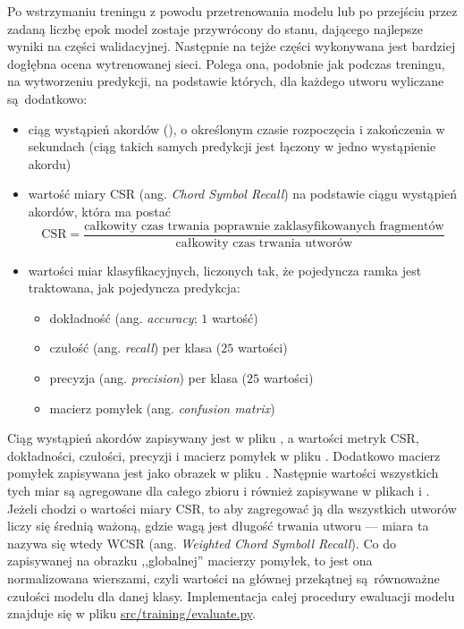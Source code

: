 Po wstrzymaniu treningu z powodu przetrenowania modelu lub po przejściu przez zadaną liczbę epok model zostaje przywrócony do stanu, dającego najlepsze wyniki na części walidacyjnej. Następnie na tejże części wykonywana jest bardziej dogłębna ocena wytrenowanej sieci. Polega ona, podobnie jak podczas treningu, na wytworzeniu predykcji, na podstawie których, dla każdego utworu wyliczane są dodatkowo: 
\begin{itemize}
    \item ciąg wystąpień akordów (), o określonym czasie rozpoczęcia i
        zakończenia w sekundach (ciąg takich samych predykcji jest łączony w jedno wystąpienie
        akordu)
    \item wartość miary CSR (ang. \emph{Chord Symbol Recall}) na podstawie
        ciągu wystąpień akordów, która ma postać
        \begin{displaymath}
            \textrm{CSR} = \frac
                        {\textrm{całkowity czas trwania poprawnie zaklasyfikowanych fragmentów}}
                        {\textrm{całkowity czas trwania utworów}}
        \end{displaymath}
    \item wartości miar klasyfikacyjnych, liczonych tak, że pojedyncza ramka jest traktowana, jak
        pojedyncza predykcja:
        \begin{itemize}
            \item dokładność (ang. \emph{accuracy}; $1$ wartość)
            \item czułość (ang. \emph{recall}) per klasa ($25$ wartości)
            \item precyzja (ang. \emph{precision}) per klasa ($25$ wartości)
            \item macierz pomyłek (ang. \emph{confusion matrix})
        \end{itemize}
\end{itemize}
Ciąg wystąpień akordów zapisywany jest w pliku , a wartości metryk CSR, dokładności, czułości, precyzji i macierz pomyłek w pliku . Dodatkowo macierz pomyłek zapisywana jest jako obrazek w pliku . Następnie wartości wszystkich tych miar są agregowane dla całego zbioru i również zapisywane w plikach  i . Jeżeli chodzi o wartości miary CSR, to aby zagregować ją dla wszystkich utworów liczy się średnią ważoną, gdzie wagą jest długość trwania utworu --- miara ta nazywa się wtedy WCSR (ang. \emph{Weighted Chord Symboll Recall}). Co do zapisywanej na obrazku ,,globalnej'' macierzy pomyłek, to jest ona normalizowana wierszami, czyli wartości na głównej przekątnej są równoważne czułości modelu dla danej klasy. Implementacja całej procedury ewaluacji modelu znajduje się w pliku \url{src/training/evaluate.py}.

